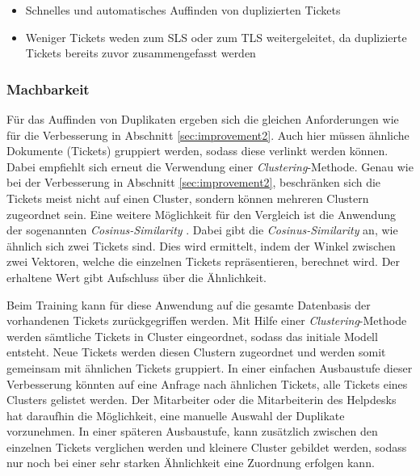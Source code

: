 \begin{itemize}
	\item Schnelles und automatisches Auffinden von duplizierten Tickets
	\item Weniger Tickets weden zum SLS oder zum TLS weitergeleitet, da duplizierte Tickets bereits zuvor zusammengefasst werden
\end{itemize}

\subsubsection{Machbarkeit}
Für das Auffinden von Duplikaten ergeben sich die gleichen Anforderungen wie für die Verbesserung in Abschnitt \ref{sec:improvement2}. Auch hier müssen ähnliche Dokumente (Tickets) gruppiert werden, sodass diese verlinkt werden können. Dabei empfiehlt sich erneut die Verwendung einer \textit{Clustering}-Methode. Genau wie bei der Verbesserung in Abschnitt \ref{sec:improvement2}, beschränken sich die Tickets meist nicht auf einen Cluster, sondern können mehreren Clustern zugeordnet sein. Eine weitere Möglichkeit für den Vergleich ist die Anwendung der sogenannten \textit{Cosinus-Similarity} \cite{steinbach2000comparison}. Dabei gibt die \textit{Cosinus-Similarity} an, wie ähnlich sich zwei Tickets sind. Dies wird ermittelt, indem der Winkel zwischen zwei Vektoren, welche die einzelnen Tickets repräsentieren, berechnet wird. Der erhaltene Wert gibt Aufschluss über die Ähnlichkeit. 

Beim Training kann für diese Anwendung auf die gesamte Datenbasis der vorhandenen Tickets zurückgegriffen werden. Mit Hilfe einer \textit{Clustering}-Methode werden sämtliche Tickets in Cluster eingeordnet, sodass das initiale Modell entsteht. Neue Tickets werden diesen Clustern zugeordnet und werden somit gemeinsam mit ähnlichen Tickets gruppiert. In einer einfachen Ausbaustufe dieser Verbesserung könnten auf eine Anfrage nach ähnlichen Tickets, alle Tickets eines Clusters gelistet werden. Der Mitarbeiter oder die Mitarbeiterin des Helpdesks hat daraufhin die Möglichkeit, eine manuelle Auswahl der Duplikate vorzunehmen. In einer späteren Ausbaustufe, kann zusätzlich zwischen den einzelnen Tickets verglichen werden und kleinere Cluster gebildet werden, sodass nur noch bei einer sehr starken Ähnlichkeit eine Zuordnung erfolgen kann.
